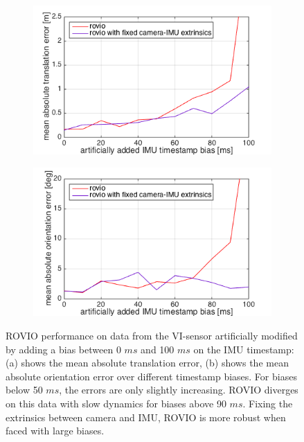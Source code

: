 \begin{figure}[h]
  \begin{subfigure}[b]{0.48\textwidth}
    \includegraphics[width=\textwidth]{images/artificial_bias_1.png}
    \caption{}
  \end{subfigure}
  \hfill
  \begin{subfigure}[b]{0.48\textwidth}
    \includegraphics[width=\textwidth]{images/artificial_bias_2.png}
    \caption{}
  \end{subfigure}
   \caption{ROVIO performance on data from the VI-sensor artificially modified by adding a bias between 0 $ms$ and 100 $ms$ on the IMU timestamp: (a) shows the mean absolute translation error, (b) shows the mean absolute orientation error over different timestamp biases. For biases below 50 $ms$, the errors are only slightly increasing. ROVIO diverges on this data with slow dynamics for biases above 90 $ms$. Fixing the extrinsics between camera and IMU, ROVIO is more robust when faced with large biases.}
   \label{pics:timesync_artificial}
\end{figure}

